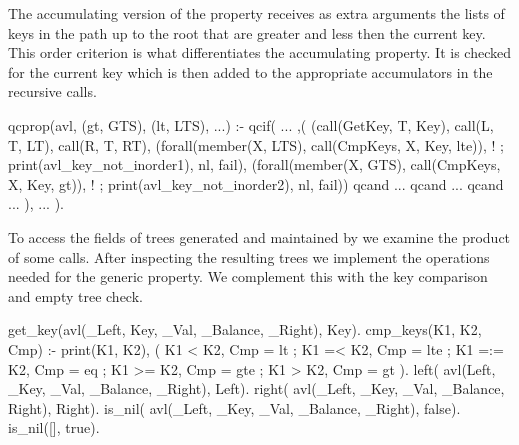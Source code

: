 The accumulating version of the property receives as extra arguments the
lists of keys in the path up to the root that are greater and less then
the current key.
%
This order criterion is what differentiates the accumulating property.
%
It is checked for the current key which is then added to the appropriate
accumulators in the recursive calls.
\begin{yapcode}
 qcprop({avl, (gt, GTS), (lt, LTS), ...}) :-
   qcif(
     ...
   ,(
     (call(GetKey, T, Key), call(L, T, LT),
      call(R, T, RT),
      (forall(member(X, LTS),
       call(CmpKeys, X, Key, lte)), !
      ; print(avl_key_not_inorder1), nl, fail),
      (forall(member(X, GTS),
       call(CmpKeys, X, Key, gt)), !
      ; print(avl_key_not_inorder2), nl, fail))
   qcand
     ...
   qcand
     ...
   qcand
     ...
   ),
     ...
   ).
\end{yapcode}


To access the fields of trees generated and maintained by 
we examine the product of some calls.
%
After inspecting the resulting trees we implement the operations needed
for the generic property.
%
We complement this with the key comparison and empty tree check.
%
\begin{yapcode}
 get_key(avl(_Left, Key, _Val,
             _Balance, _Right), Key).
 cmp_keys(K1, K2, Cmp) :-
   print({K1, K2}),
 ( K1 < K2, Cmp = lt
 ; K1 =< K2, Cmp = lte
 ; K1 =:= K2, Cmp = eq
 ; K1 >= K2, Cmp = gte
 ; K1 > K2, Cmp = gt
 ).
 left( avl(Left, _Key, _Val,
           _Balance, _Right), Left).
 right( avl(_Left, _Key, _Val,
            _Balance, Right), Right).
 is_nil( avl(_Left, _Key, _Val,
             _Balance, _Right), false).
 is_nil([], true).
\end{yapcode}



